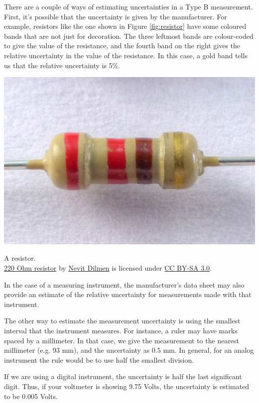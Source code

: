 \documentclass[justified]{tufte-handout}
\begin{document}
There are a couple of ways of estimating uncertainties in a Type B
measurement. First, it's possible that the uncertainty is given by the
manufacturer. For example, resistors like the one shown in Figure
\ref{fig:resistor}
have some coloured bands that are not just for decoration. The three
leftmost bands are colour-coded to give the value of the resistance,
and the fourth band on the right gives the relative uncertainty in the value of
the resistance. In this case, a gold band tells us that the relative 
uncertainty is 5\%. 
\begin{marginfigure}
  \includegraphics{./graphics-uncertainties/resistor.jpg}
  \caption{A resistor. \\ 
  \href{https://commons.wikimedia.org/wiki/File\%3AResistor_1480417_8_9_HDR_Enhancer_1.jpg}{220 Ohm resistor} by \href{https://commons.wikimedia.org/wiki/User:Nevit}{Nevit Dilmen} is licensed under \href{https://creativecommons.org/licenses/by-sa/3.0/deed.en}{CC BY-SA 3.0}.}
  \label{fig:resistor}
\end{marginfigure}

In the case of a measuring instrument, the manufacturer's data sheet
may also provide an estimate of the relative uncertainty for measurements made
with that instrument. 

The other way to estimate the measurement uncertainty is using the
smallest interval that the instrument measures. For instance, a ruler
may have marks spaced by a millimeter. In that case, we give the
measurement to the nearest millimeter (e.g. 93 mm), and the
uncertainty as $0.5$ mm. In general, for an analog instrument the rule
would be to use half the smallest division. 

If we are using a digital instrument, the uncertainty is half the last
significant digit. Thus, if your voltmeter is showing 9.75 Volts, the
uncertainty is estimated to be 0.005 Volts. 
\end{document}
